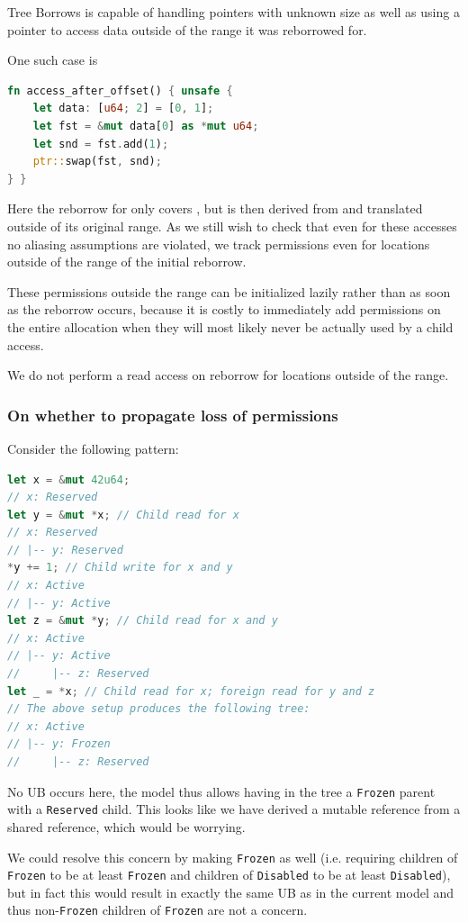 \documentclass[a4paper,11pt]{article}
\theoremstyle{plain}
\theoremstyle{definition}
\theoremstyle{remark}
\newcommand{\tcode}[1]{\rstinline{#1}}
\newcommand{\tperm}[1]{\texttt{#1}}
\begin{document}
Tree Borrows is capable of handling pointers with unknown size as well as using
a pointer to access data outside of the range it was reborrowed for.

One such case is
\begin{lstlisting}[language=rust]
fn access_after_offset() { unsafe {
    let data: [u64; 2] = [0, 1];
    let fst = &mut data[0] as *mut u64;
    let snd = fst.add(1);
    ptr::swap(fst, snd);
} }
\end{lstlisting}
Here the reborrow for \tcode{fst} only covers \tcode{data[0]}, but \tcode{snd} is then derived from
\tcode{fst} and translated outside of its original range. As we still wish to check
that even for these accesses no aliasing assumptions are violated, we track
permissions even for locations outside of the range of the initial reborrow.

These permissions outside the range can be initialized lazily rather than as soon
as the reborrow occurs, because it is costly to immediately add permissions
on the entire allocation when they will most likely never be actually used by
a child access.

We do not perform a read access on reborrow for locations outside of the range.

\subsubsection{On whether to propagate loss of permissions}

Consider the following pattern:
\begin{lstlisting}[language=rust]
let x = &mut 42u64;
// x: Reserved
let y = &mut *x; // Child read for x
// x: Reserved
// |-- y: Reserved
*y += 1; // Child write for x and y
// x: Active
// |-- y: Active
let z = &mut *y; // Child read for x and y
// x: Active
// |-- y: Active
//     |-- z: Reserved
let _ = *x; // Child read for x; foreign read for y and z
// The above setup produces the following tree:
// x: Active
// |-- y: Frozen
//     |-- z: Reserved
\end{lstlisting}
No UB occurs here, the model thus allows having in the tree a \tperm{Frozen} parent with a \tperm{Reserved} child.
This looks like we have derived a mutable reference from a shared reference, which would
be worrying.

We could resolve this concern by making \tcode{z} \tperm{Frozen} as well (i.e. requiring
children of \tperm{Frozen} to be at least \tperm{Frozen} and children of \tperm{Disabled} to be
at least \tperm{Disabled}), but in fact this would result in exactly the same
UB as in the current model and thus non-\tperm{Frozen} children of \tperm{Frozen} are not
a concern.
\end{document}
